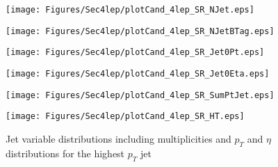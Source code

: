 \begin{figure}[!htbp]
  \begin{minipage}[h]{0.5\textwidth}
    \centering \texttt{[image: Figures/Sec4lep/plotCand\_4lep\_SR\_NJet.eps]}
  \end{minipage}\hfill
  \begin{minipage}[h]{0.5\textwidth}
    \centering \texttt{[image: Figures/Sec4lep/plotCand\_4lep\_SR\_NJetBTag.eps]}
  \end{minipage}\hfill
  \begin{minipage}[h]{0.5\textwidth}
    \centering \texttt{[image: Figures/Sec4lep/plotCand\_4lep\_SR\_Jet0Pt.eps]}
  \end{minipage}\hfill
  \begin{minipage}[h]{0.5\textwidth}
    \centering \texttt{[image: Figures/Sec4lep/plotCand\_4lep\_SR\_Jet0Eta.eps]}
  \end{minipage}\hfill
  \begin{minipage}[h]{0.5\textwidth}
    \centering \texttt{[image: Figures/Sec4lep/plotCand\_4lep\_SR\_SumPtJet.eps]}
  \end{minipage}\hfill
  \begin{minipage}[h]{0.5\textwidth}
    \centering \texttt{[image: Figures/Sec4lep/plotCand\_4lep\_SR\_HT.eps]}
  \end{minipage}\hfill
  \caption{ Jet variable distributions including multiplicities and $p_T$ and $\eta$ distributions for the highest $p_T$ jet }
  \label{fig:4lSR_jets}
\end{figure}






